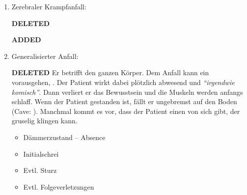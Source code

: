 \documentclass[
ngerman,
paper=a4,
asymmetric,
fontsize=10pt,
headings=small,
draft=false,
numbers=noenddot,
bibtotocnumbered,
footnotes=multiple,
]{scrreprt}
\newcommand{\jALT}{{\color{red}\sffamily\textbf{DELETED}\hrulefill\newline\newline}}
\newcommand{\jALTende}{\newline{\color{red}\rule{\linewidth}{2pt}\newline}}
\newcommand{\jNEU}{{\color{green}\sffamily\textbf{ADDED}\hrulefill\newline\newline}}
\newcommand{\jNEUende}{\newline{\color{green}\rule{\linewidth}{3pt}\newline}}
\begin{document}
\begin{enumerate}
{
Die wichtigste Differentialdiagnose ist eine Störung des
-Stoffwechsels. Sowohl die Hyper-, als auch
die Hypoglykämie können , daher
muss der Blutzucker immer gemessen werden!
Ebenso ist immer
an  zu denken.

Die Abgrenzung zu anderen neurologischen Erkrankungen ist
ohne weitergehende Untersuchungen oft schwierig bzw. schwer
möglich. 
}{
\begin{itemize}
  \item Blutzucker ${\downarrow}$, ${\uparrow}$
  \item Sonstige neurologische Erkrankung.
  \item Vergiftungen
\end{itemize}

}{}{}{}
\jNEUende

\item Zerebraler Krampfanfall:

\jALT
{}
\jALTende

\jNEU
{}
\jNEUende

\item Generalisierter Anfall:

\jALT
{}
{%
Er betrifft den ganzen Körper. Dem Anfall kann ein
 vorausgehen, . Der Patient wirkt
 dabei plötzlich abwesend und \emph{\enquote{irgendwie komisch}}.
 Dann verliert er das Bewusstsein und die Muskeln werden
 anfangs schlaff. Wenn der Patient gestanden ist, fällt er
 ungebremst auf den Boden (Cave: ).
 Manchmal kommt es vor, dass der Patient einen
  von sich gibt, der
 gruselig klingen kann. 
}{
\begin{itemize}
  \item Dämmerzustand -- Absence
  \item Initialschrei
  \item Evtl. Sturz
  \item Evtl. Folgeverletzungen
\end{itemize}

}
\end{enumerate}
\end{document}
